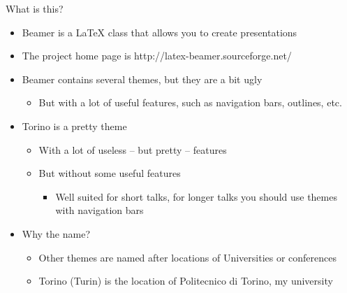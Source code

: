 
\begin{frame}[t]
\titlepage
\end{frame}

\begin{frame}[t]{What is this?}
\begin{itemize}
\item Beamer is a \LaTeX{} class that allows you to create presentations
\item The project home page is http://latex-beamer.sourceforge.net/
\item Beamer contains several themes, but they are a bit ugly
  \begin{itemize}
  \item But with a lot of useful features, such as navigation bars, outlines,
        etc.
  \end{itemize}
\item Torino is a pretty theme
  \begin{itemize}
  \item With a lot of useless -- but pretty -- features
  \item But without some useful features
    \begin{itemize}
    \item Well suited for short talks, for longer talks you should use themes
        with navigation bars
    \end{itemize}
  \end{itemize}
\item Why the name?
  \begin{itemize}
  \item Other themes are named after locations of Universities or conferences
  \item Torino (Turin) is the location of Politecnico di Torino, my university
  \end{itemize}
\end{itemize}
\end{frame}

